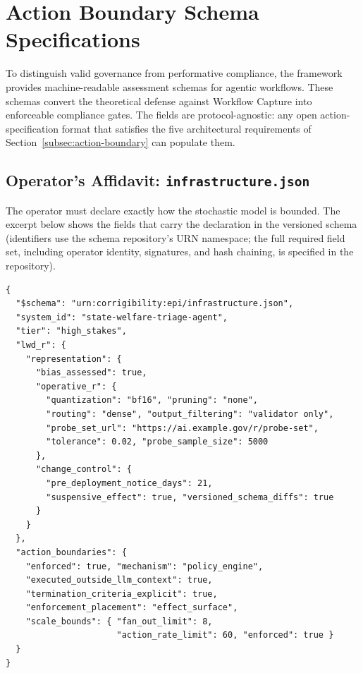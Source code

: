\documentclass{article}
\theoremstyle{definition}
\begin{document}

\appendix

\section{Action Boundary Schema Specifications}
\label{appendix:agentic-schema}

To distinguish valid governance from performative compliance, the framework provides machine-readable assessment schemas for agentic workflows. These schemas convert the theoretical defense against Workflow Capture into enforceable compliance gates. The fields are protocol-agnostic: any open action-specification format that satisfies the five architectural requirements of Section~\ref{subsec:action-boundary} can populate them.

\subsection{Operator's Affidavit: \texttt{infrastructure.json}}

The operator must declare exactly how the stochastic model is bounded. The excerpt below shows the fields that carry the declaration in the versioned schema (identifiers use the schema repository's URN namespace; the full required field set, including operator identity, signatures, and hash chaining, is specified in the repository).

\begin{verbatim}
{
  "$schema": "urn:corrigibility:epi/infrastructure.json",
  "system_id": "state-welfare-triage-agent",
  "tier": "high_stakes",
  "lwd_r": {
    "representation": {
      "bias_assessed": true,
      "operative_r": {
        "quantization": "bf16", "pruning": "none",
        "routing": "dense", "output_filtering": "validator only",
        "probe_set_url": "https://ai.example.gov/r/probe-set",
        "tolerance": 0.02, "probe_sample_size": 5000
      },
      "change_control": {
        "pre_deployment_notice_days": 21,
        "suspensive_effect": true, "versioned_schema_diffs": true
      }
    }
  },
  "action_boundaries": {
    "enforced": true, "mechanism": "policy_engine",
    "executed_outside_llm_context": true,
    "termination_criteria_explicit": true,
    "enforcement_placement": "effect_surface",
    "scale_bounds": { "fan_out_limit": 8,
                      "action_rate_limit": 60, "enforced": true }
  }
}
\end{verbatim}
\end{document}
